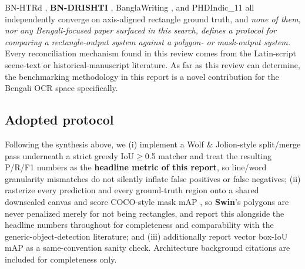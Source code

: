 \documentclass[11pt]{article}
\newcommand{\swin}{\textbf{Swin}}
\newcommand{\bnd}{\textbf{BN-DRISHTI}}
\begin{document}
BN-HTRd \cite{rahman2022bnhtrd}, \bnd{} \cite{jubaer2023bndrishti}, BanglaWriting
\cite{mridha2021banglawriting}, and PHDIndic\_11 \cite{obaidullah2018phdindic11} all
independently converge on axis-aligned rectangle ground truth, and \emph{none of them,
nor any Bengali-focused paper surfaced in this search, defines a protocol for comparing
a rectangle-output system against a polygon- or mask-output system.} Every
reconciliation mechanism found in this review comes from the Latin-script scene-text or
historical-manuscript literature. As far as this review can determine, the benchmarking
methodology in this report is a novel contribution for the Bengali OCR space
specifically.

\subsection{Adopted protocol}

Following the synthesis above, we (i) implement a Wolf \& Jolion-style split/merge pass
\cite{wolf2006detEval} underneath a strict greedy IoU$\geq$0.5 matcher and treat the
resulting P/R/F1 numbers as the \textbf{headline metric of this report}, so line/word
granularity mismatches do not silently inflate false positives or false negatives; (ii)
rasterize every prediction and every ground-truth region onto a shared downscaled canvas
and score COCO-style mask mAP \cite{lin2014coco}, so \swin's polygons are never penalized
merely for not being rectangles, and report this alongside the headline numbers
throughout for completeness and comparability with the generic-object-detection
literature; and (iii) additionally report vector box-IoU mAP as a same-convention sanity
check. Architecture background citations \cite{liu2021swintransformer,he2017maskrcnn}
are included for completeness only.
\end{document}

